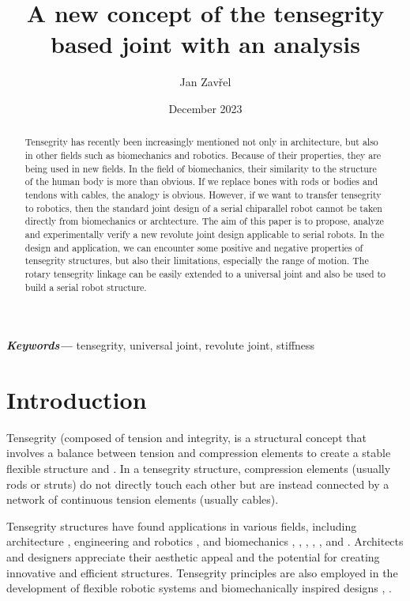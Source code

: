 \documentclass{article}
\title{A new concept of the tensegrity based joint with an analysis}
\author[1]{Jan Zavřel}
\affil[1]{Czech Technical University in Prague, Faculty of Mechanical Engineering, Technická 4, Prague 6, 16000, Czech Republic}
\date{December 2023}
\providecommand{\keywords}[1]
{
  \small	
  \textbf{\textit{Keywords---}} #1
}
\begin{document}
\maketitle

\keywords{tensegrity, universal joint, revolute joint, stiffness}

\begin{abstract}
Tensegrity has recently been increasingly mentioned not only in architecture, but also in other fields such as biomechanics and robotics. Because of their properties, they are being used in new fields. In the field of biomechanics, their similarity to the structure of the human body is more than obvious. If we replace bones with rods or bodies and tendons with cables, the analogy is obvious. However, if we want to transfer tensegrity to robotics, then the standard joint design of a serial chiparallel robot cannot be taken directly from biomechanics or archtecture. The aim of this paper is to propose, analyze and experimentally verify a new revolute joint design applicable to serial robots. In the design and application, we can encounter some positive and negative properties of tensegrity structures, but also their limitations, especially the range of motion. The rotary tensegrity linkage can be easily extended to a universal joint and also be used to build a serial robot structure.
\end{abstract}

\section{Introduction}
Tensegrity (composed of tension and integrity, is a structural concept that involves a balance between tension and compression elements to create a stable  flexible structure  \cite{Ref_Snelson_1996} and \cite{Ref_Skelton_2001_introduction}. In a tensegrity structure, compression elements (usually rods or struts) do not directly touch each other but are instead connected by a network of continuous tension elements (usually cables).

Tensegrity structures have found applications in various fields, including architecture \cite{Ref_Skelton_2001_introduction}, engineering and robotics \cite{Ref_Krivosej_OWN_tensegrity_based_robots}, and biomechanics \cite{Ref_Scarr_BIO_elbow}, \cite{Ref_Xiongdun_BIO_wrist}, \cite{Ref_Jung_BIO_Flefural_Joint}, \cite{Ref_Li_BIO_Tensegritic_shoulder}, \cite{Ref_Sun_BIO_foot_tens_structure}, \cite{Ref_Lessard_BIO_lightweight_tens_joint} and \cite{Ref_Jung_BIO_Muscle_excitations_tens_joint}. Architects and designers appreciate their aesthetic appeal and the potential for creating innovative and efficient structures. Tensegrity principles are also employed in the development of flexible robotic systems and biomechanically inspired designs \cite{Ref_Xiongdun_BIO_wrist}, \cite{Ref_Jung_BIO_Muscle_excitations_tens_joint}.
\end{document}
